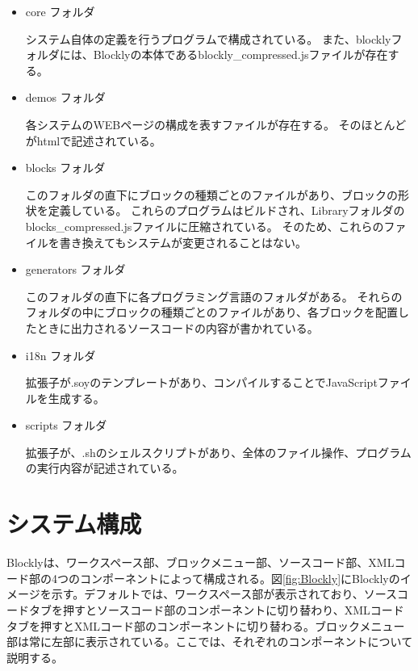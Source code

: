 \documentclass{eniepaper}
\begin{document}
\begin{itemize}

\item core フォルダ

システム自体の定義を行うプログラムで構成されている。
また、blocklyフォルダには、Blocklyの本体であるblockly\_compressed.jsファイルが存在する。

\item demos フォルダ

各システムのWEBページの構成を表すファイルが存在する。
そのほとんどがhtmlで記述されている。

\item blocks フォルダ

このフォルダの直下にブロックの種類ごとのファイルがあり、ブロックの形状を定義している。
これらのプログラムはビルドされ、Libraryフォルダのblocks\_compressed.jsファイルに圧縮されている。
そのため、これらのファイルを書き換えてもシステムが変更されることはない。

\item generators フォルダ

このフォルダの直下に各プログラミング言語のフォルダがある。
それらのフォルダの中にブロックの種類ごとのファイルがあり、各ブロックを配置したときに出力されるソースコードの内容が書かれている。

\item i18n フォルダ

拡張子が.soyのテンプレートがあり、コンパイルすることでJavaScriptファイルを生成する。

\item scripts フォルダ

拡張子が、.shのシェルスクリプトがあり、全体のファイル操作、プログラムの実行内容が記述されている。


\end{itemize} 
  
   \section{システム構成}
   
Blocklyは、ワークスペース部、ブロックメニュー部、ソースコード部、XMLコード部の4つのコンポーネントによって構成される。図\ref{fig:Blockly}にBlocklyのイメージを示す。デフォルトでは、ワークスペース部が表示されており、ソースコードタブを押すとソースコード部のコンポーネントに切り替わり、XMLコードタブを押すとXMLコード部のコンポーネントに切り替わる。ブロックメニュー部は常に左部に表示されている。ここでは、それぞれのコンポーネントについて説明する。
  
\end{document}
